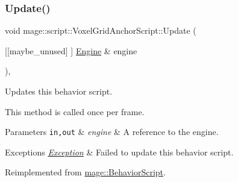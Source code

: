 \subsubsection{\texorpdfstring{Update()}{Update()}}
{\footnotesize\ttfamily void mage\+::script\+::\+Voxel\+Grid\+Anchor\+Script\+::\+Update (\begin{DoxyParamCaption}\item[{\mbox{[}\mbox{[}maybe\+\_\+unused\mbox{]} \mbox{]} \mbox{\hyperlink{classmage_1_1_engine}{Engine}} \&}]{engine }\end{DoxyParamCaption})\hspace{0.3cm}{\ttfamily [override]}, {\ttfamily [virtual]}}

Updates this behavior script.

This method is called once per frame.


\begin{DoxyParams}[1]{Parameters}
\mbox{\tt in,out}  & {\em engine} & A reference to the engine. \\
\hline
\end{DoxyParams}

\begin{DoxyExceptions}{Exceptions}
{\em \mbox{\hyperlink{classmage_1_1_exception}{Exception}}} & Failed to update this behavior script. \\
\hline
\end{DoxyExceptions}


Reimplemented from \mbox{\hyperlink{classmage_1_1_behavior_script_a085634661326b59850c1111e537baa4e}{mage\+::\+Behavior\+Script}}.

